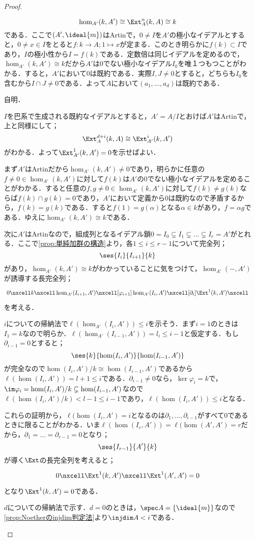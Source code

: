 \begin{proof}
\begin{eqv}[7]
		\[\hom_{A'}(k,A')\cong\Ext^n_A(k,A)\cong k\]
		である．ここで$(A',\ideal{m})$はArtinで，$0\neq I$を$A'$の極小なイデアルとすると，$0\neq x\in I$をとると$f:k\to A;1\mapsto x$が定まる．このとき明らかに$f(k)\subset I$であり，$I$の極小性から$I=f(k)$である．定数倍は同じイデアルを定めるので，$\hom_{A'}(k,A')\cong k$だから$A'$は$0$でない極小なイデアル$I_0$を唯１つもつことがわかる．すると，$A'$において$0$は既約である．実際$I,J\neq 0$とすると，どちらも$I_0$を含むから$I\cap J\neq0$である．よって$A$において$(a_1,\dots,a_d)$は既約である．
		\item 自明．
		\item $I$を巴系で生成される既約なイデアルとすると，$A'=A/I$とおけば$A'$はArtinで，上と同様にして；
		\[\Ext^{d+i}_A(k,A)\cong\Ext^i_{A'}(k,A')\]
		がわかる．よって$\Ext^1_{A'}(k,A')=0$を示せばよい．
		
		まず$A'$はArtinだから$\hom_{A'}(k,A')\neq0$であり，明らかに任意の$f\neq0\in\hom_{A'}(k,A')$に対して$f(k)$は$A'$の$0$でない極小なイデアルを定めることがわかる．すると任意の$f,g\neq0\in\hom_{A'}(k,A')$に対して$f(k)\neq g(k)$ならば$f(k)\cap g(k)=0$であり，$A'$において定義から$0$は既約なので矛盾するから，$f(k)=g(k)$である．すると$f(1)=g(\alpha)$となる$\alpha\in k$があり，$f=\alpha g$である．ゆえに$\hom_{A'}(k,A')\cong k$である．
		
		次に$A'$はArtinなので，組成列となるイデアル鎖$0=I_0\subsetneq I_1\subsetneq\dots\subsetneq I_r=A'$がとれる．ここで\ref{prop:単純加群の構造}より，各$1\leq i\leq r-1$について完全列；
		\[\ses{I_i}{I_{i+1}}{k}\]
		があり，$\hom_{A'}(k,A')\cong k$がわかっていることに気をつけて，$\hom_{A'}(-,A')$が誘導する長完全列；
		\[\begin{tikzcd}
		0\nxcell k\nxcell\hom_{A'}(I_{i+1},A')\nxcell[\varphi_{i+1}]\hom_{A'}(I_i,A')\nxcell[\partial_i]\Ext^1(k,A')\nxcell
		\end{tikzcd}\]
		を考える．
		
		$i$についての帰納法で$\ell(\hom_{A'}(I_i,A'))\leq i$を示そう．まず$i=1$のときは$I_1=k$なので明らか．$\ell(\hom_{A'}(I_{i-1},A'))=l_i\leq i-1$と仮定する．もし$\partial_{i-1}=0$とすると；
		\[\ses{k}{\hom(I_i,A')}{\hom(I_{i-1},A')}\]
		が完全なので$\hom(I_i,A')/k\cong\hom(I_{i-1},A')$であるから$\ell(\hom(I_i,A'))=l+1\leq i$である．$\partial_{i-1}\neq0$なら，$\ker\varphi_{i}=k$で，$\im\varphi_{i}=\hom(I_i,A')/k\subsetneq\hom(I_{i-1},A')$なので$\ell(\hom(I_i,A')/k)<l-1\leq i-1$であり，$\ell(\hom(I_i,A'))\leq i$となる．
		
		これらの証明から，$\ell(\hom(I_i,A')=i$となるのは$\partial_1,\dots,\partial_{i-1}$がすべて$0$であるときに限ることがわかる．いま$\ell(\hom(I_r,A'))=\ell(\hom(A',A')=r$だから，$\partial_1=\dots=\partial_{r-1}=0$となり；
		\[\ses{I_{r-1}}{A'}{k}\]
		が導く$\Ext$の長完全列を考えると；
		\[\begin{tikzcd}0\nxcell\Ext^1(k,A')\nxcell\Ext^1(A',A')=0
		\end{tikzcd}\]
		となり$\Ext^1(k,A')=0$である．
		\item
		$d$についての帰納法で示す．$d=0$のときは，$\spec A=\{\ideal{m}\}$なので\ref{prop:Noetherのinjdim判定法}より$\injdim A<i$である．
		

\end{eqv}
\end{proof}
